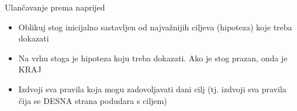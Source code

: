 \documentclass[xcolor=dvipsnames]{beamer}
\begin{document}
\begin{frame}{Ulančavanje prema naprijed}

\begin{itemize}
\item Oblikuj stog inicijalno sastavljen od najvažnijih ciljeva (hipoteza) koje treba dokazati
\item Na vrhu stoga je hipoteza koju treba dokazati. Ako je stog prazan, onda je KRAJ
\item Izdvoji sva pravila koja mogu zadovoljavati dani cilj (tj. izdvoji sva pravila čija se DESNA strana podudara s ciljem)

\end{itemize}

\end{frame}
\end{document}
